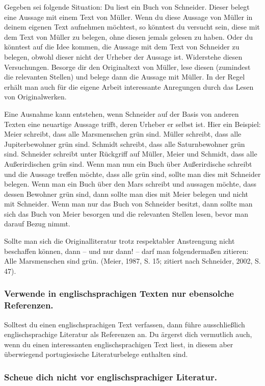\documentclass{../cssheet}
\begin{document}
Gegeben sei folgende Situation: Du liest ein Buch von Schneider. Dieser
belegt eine Aussage mit einem Text von Müller. Wenn du diese Aussage von
Müller in deinem eigenen Text aufnehmen möchtest, so könntest du
versucht sein, diese mit dem Text von Müller zu belegen, ohne diesen
jemals gelesen zu haben. Oder du könntest auf die Idee kommen, die
Aussage mit dem Text von Schneider zu belegen, obwohl dieser nicht der
Urheber der Aussage ist. Widerstehe diesen Versuchungen. Besorge dir den
Originaltext von Müller, lese diesen (zumindest die relevanten Stellen)
und belege dann die Aussage mit Müller. In der Regel erhält man auch für
die eigene Arbeit interessante Anregungen durch das Lesen von
Originalwerken.

Eine Ausnahme kann entstehen, wenn Schneider auf der Basis von anderen
Texten eine neuartige Aussage trifft, deren Urheber er selbst ist. Hier
ein Beispiel: Meier schreibt, dass alle Marsmenschen grün sind. Müller
schreibt, dass alle Jupiterbewohner grün sind. Schmidt schreibt, dass
alle Saturnbewohner grün sind. Schneider schreibt unter Rückgriff auf
Müller, Meier und Schmidt, dass alle Außerirdischen grün sind. Wenn man
nun ein Buch über Außerirdische schreibt und die Aussage treffen möchte,
dass alle grün sind, sollte man dies mit Schneider belegen. Wenn man ein
Buch über den Mars schreibt und aussagen möchte, dass dessen Bewohner
grün sind, dann sollte man dies mit Meier belegen und nicht mit
Schneider. Wenn man nur das Buch von Schneider besitzt, dann sollte man
sich das Buch von Meier besorgen und die relevanten Stellen lesen, bevor
man darauf Bezug nimmt.

Sollte man sich die Originalliteratur trotz respektabler Anstrengung
nicht beschaffen können, dann -- und nur dann! -- darf man
folgendermaßen zitieren: \glqq{}Alle Marsmenschen sind grün.\grqq{} (Meier, 1987, S.
15; zitiert nach Schneider, 2002, S. 47).

\subsubsection*{Verwende in englischsprachigen Texten nur ebensolche Referenzen.}

Solltest du einen englischsprachigen Text verfassen, dann führe
ausschließlich englischsprachige Literatur als Referenzen an. Du ärgerst
dich vermutlich auch, wenn du einen interessanten englischsprachigen
Text liest, in diesem aber überwiegend portugiesische Literaturbelege
enthalten sind.

\subsubsection*{Scheue dich nicht vor englischsprachiger Literatur.}
\end{document}
